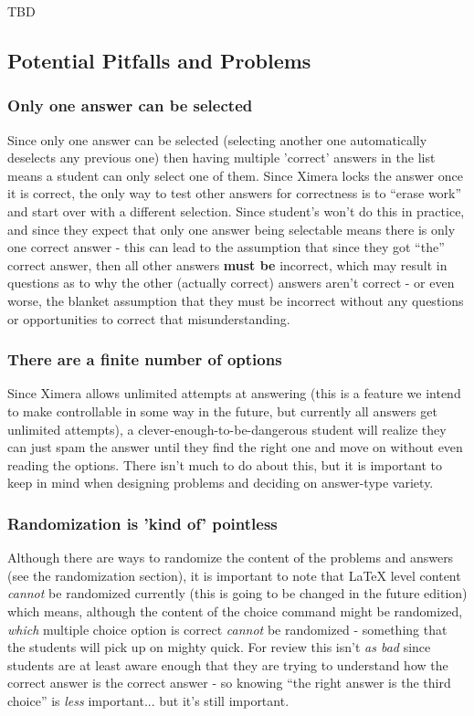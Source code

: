 \documentclass{ximera}
\begin{document}
        TBD
        
    \subsection*{Potential Pitfalls and Problems}
        
        \subsubsection*{Only one answer can be selected}
            Since only one answer can be selected (selecting another one automatically deselects any previous one) then having multiple 'correct' answers in the list means a student can only select one of them. Since Ximera locks the answer once it is correct, the only way to test other answers for correctness is to ``erase work'' and start over with a different selection. Since student's won't do this in practice, and since they expect that only one answer being selectable means there is only one correct answer - this can lead to the assumption that since they got ``the'' correct answer, then all other answers \textbf{must be} incorrect, which may result in questions as to why the other (actually correct) answers aren't correct - or even worse, the blanket assumption that they must be incorrect without any questions or opportunities to correct that misunderstanding.
            
        \subsubsection*{There are a finite number of options}
            Since Ximera allows unlimited attempts at answering (this is a feature we intend to make controllable in some way in the future, but currently all answers get unlimited attempts), a clever-enough-to-be-dangerous student will realize they can just spam the answer until they find the right one and move on without even reading the options. There isn't much to do about this, but it is important to keep in mind when designing problems and deciding on answer-type variety.
            
        \subsubsection*{Randomization is 'kind of' pointless}
            Although there are ways to randomize the content of the problems and answers (see the randomization section), it is important to note that LaTeX level content \textit{cannot} be randomized currently (this is going to be changed in the future edition) which means, although the content of the choice command might be randomized, \textit{which} multiple choice option is correct \textit{cannot} be randomized - something that the students will pick up on mighty quick. For review this isn't \textit{as bad} since students are at least aware enough that they are trying to understand how the correct answer is the correct answer - so knowing ``the right answer is the third choice'' is \textit{less} important... but it's still important.
            
\end{document}
